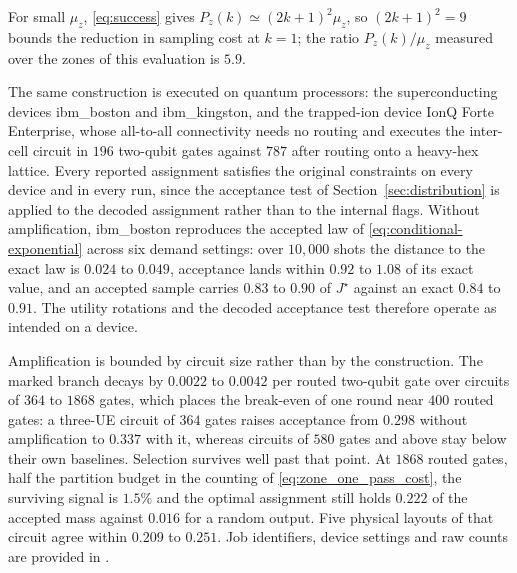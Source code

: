 

For small $\mu_z$, \eqref{eq:success} gives $P_z(k)\simeq(2k+1)^2\mu_z$, so
$(2k+1)^2=9$ bounds the reduction in sampling cost at $k=1$; the ratio
$P_z(k)/\mu_z$ measured over the zones of this evaluation is $5.9$.


The same construction is executed on quantum processors: the superconducting
devices ibm\_boston and ibm\_kingston, and the trapped-ion device IonQ Forte
Enterprise, whose all-to-all connectivity needs no routing and executes the
inter-cell circuit in $196$ two-qubit gates against $787$ after routing onto a
heavy-hex lattice. Every reported assignment satisfies the original
constraints on every device and in every run, since the acceptance test of
Section~\ref{sec:distribution} is applied to the decoded assignment rather
than to the internal flags. Without amplification, ibm\_boston reproduces the
accepted law of \eqref{eq:conditional-exponential} across six demand settings:
over $10{,}000$ shots the distance to the exact law is $0.024$ to $0.049$,
acceptance lands within $0.92$ to $1.08$ of its exact value, and an accepted
sample carries $0.83$ to $0.90$ of $J^\star$ against an exact $0.84$ to $0.91$.
The utility rotations and the decoded acceptance test therefore operate as
intended on a device.

Amplification is bounded by circuit size rather than by the construction. The
marked branch decays by $0.0022$ to $0.0042$ per routed two-qubit gate over
circuits of $364$ to $1868$ gates, which places the break-even of one round
near $400$ routed gates: a three-UE circuit of $364$ gates raises acceptance
from $0.298$ without amplification to $0.337$ with it, whereas circuits of
$580$ gates and above stay below their own baselines. Selection survives well
past that point. At $1868$ routed gates, half the partition budget in the
counting of \eqref{eq:zone_one_pass_cost}, the surviving signal is $1.5\%$ and
the optimal assignment still holds $0.222$ of the accepted mass against
$0.016$ for a random output. Five physical layouts of that circuit agree
within $0.209$ to $0.251$. Job identifiers, device settings and raw counts are
provided in \cite{scqfrepo}.



